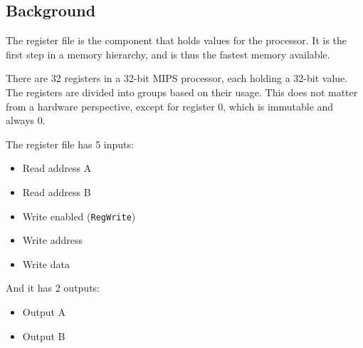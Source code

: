 \documentclass{beamer}
\begin{document}
\subsection{Background}
\begin{frame}
    The register file is the component that holds values for the processor. It
    is the first step in a memory hierarchy, and is thus the fastest memory
    available.

    \vspace{\baselineskip}
    There are 32 registers in a 32-bit MIPS processor, each holding a 32-bit
    value. The registers are divided into groups based on their usage. This
    does not matter from a hardware perspective, except for register 0, which
    is immutable and always 0.
\end{frame}
\begin{frame}
    The register file has 5 inputs:
    \begin{itemize}
        \item Read address A
        \item Read address B
        \item Write enabled (\texttt{RegWrite})
        \item Write address
        \item Write data
    \end{itemize}
    And it has 2 outputs:
    \begin{itemize}
        \item Output A
        \item Output B
    \end{itemize}
\end{frame}
\end{document}
